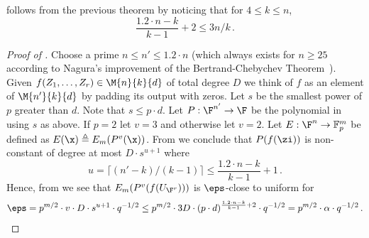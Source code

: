  follows
from the previous theorem by noticing that for $4\leq k \leq n$,
\[\frac{1.2\cdot n-k}{k-1} +2 \leq 3n/k\,.\]

\begin{proof}[Proof of ]
Choose a prime $n\leq n'\leq 1.2\cdot n$ (which always exists for $n\geq 25 $ according to Nagura's improvement of the
Bertrand-Chebychev Theorem~\cite{Na52}).
Given $f(Z_1,\ldots,Z_r)\in \M{n}{k}{d}$ of total degree $D$ we think of $f$ as an element of $ \M{n'}{k}{d}$
by padding its output with zeros.
Let $s$ be the smallest power of $p$ greater than $d$.
Note that $s\leq p\cdot d$.
Let $P:\F^{n'}\to \F$ be the polynomial in  using $s$ as above.
If $p=2$ let $v=3$ and otherwise let $v=2$.
Let $E:\F^n\to \mathbb{F}_p^m$ be defined as $E(\x)\triangleq E_m(P^v(\x))$.
{}From  we conclude that $P(f(\zi))$ is non-constant of degree at most $D\cdot s^{u+1}$
where 
\[
u= \lceil (n'-k)/(k-1)\rceil \leq  \frac{ 1.2\cdot n-k}{k-1} + 1\,.
\]
Hence, from  we see that $E_m(P^v(f(U_{\F^r})))$ is $\eps$-close to uniform
for
\[\eps = p^{m/2}\cdot v\cdot D\cdot s^{u+1}\cdot q^{-1/2}\leq
p^{m/2}\cdot 3 D \cdot (p\cdot d)^{\frac{1.2\cdot n-k}{k-1} +2}\cdot q^{-1/2}
=p^{m/2}\cdot \alpha\cdot q^{-1/2}\,.\qedhere\]
\end{proof}
